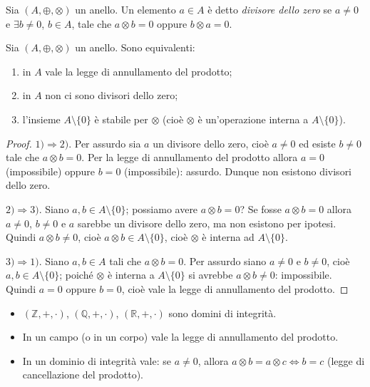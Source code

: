 \documentclass[11pt,a4paper]{article}
\begin{document}
\begin{definizione}
Sia $(A, \oplus, \otimes)$ un anello. Un elemento $a \in A$ è detto \emph{divisore dello zero} se $a \neq 0$ e $\exists b \neq 0$, $b \in A$, tale che $a \otimes b = 0$ oppure $b \otimes a = 0$.
\end{definizione}

\begin{proposizione}
Sia $(A, \oplus, \otimes)$ un anello. Sono equivalenti:
\begin{enumerate}
  \item in $A$ vale la legge di annullamento del prodotto;
  \item in $A$ non ci sono divisori dello zero;
  \item l'insieme $A\setminus\{0\}$ è stabile per $\otimes$ (cioè $\otimes$ è un'operazione interna a $A\setminus\{0\}$).
\end{enumerate}
\end{proposizione}

\begin{proof}
$1) \Rightarrow 2)$. Per assurdo sia $a$ un divisore dello zero, cioè $a \neq 0$ ed esiste $b \neq 0$ tale che $a \otimes b = 0$. Per la legge di annullamento del prodotto allora $a = 0$ (impossibile) oppure $b = 0$ (impossibile): assurdo. Dunque non esistono divisori dello zero.

$2) \Rightarrow 3)$. Siano $a, b \in A\setminus\{0\}$; possiamo avere $a \otimes b = 0$? Se fosse $a \otimes b = 0$ allora $a \neq 0$, $b \neq 0$ e $a$ sarebbe un divisore dello zero, ma non esistono per ipotesi. Quindi $a \otimes b \neq 0$, cioè $a \otimes b \in A\setminus\{0\}$, cioè $\otimes$ è interna ad $A\setminus\{0\}$.

$3) \Rightarrow 1)$. Siano $a, b \in A$ tali che $a \otimes b = 0$. Per assurdo siano $a \neq 0$ e $b \neq 0$, cioè $a, b \in A\setminus\{0\}$; poiché $\otimes$ è interna a $A\setminus\{0\}$ si avrebbe $a \otimes b \neq 0$: impossibile. Quindi $a = 0$ oppure $b = 0$, cioè vale la legge di annullamento del prodotto.
\end{proof}

\begin{osservazione}
\begin{itemize}
  \item $(\mathbb{Z}, +, \cdot)$, $(\mathbb{Q}, +, \cdot)$, $(\mathbb{R}, +, \cdot)$ sono domini di integrità.
  \item In un campo (o in un corpo) vale la legge di annullamento del prodotto.
  \item In un dominio di integrità vale: se $a \neq 0$, allora $a \otimes b = a \otimes c \iff b = c$ (legge di cancellazione del prodotto).
\end{itemize}
\end{osservazione}
\end{document}

